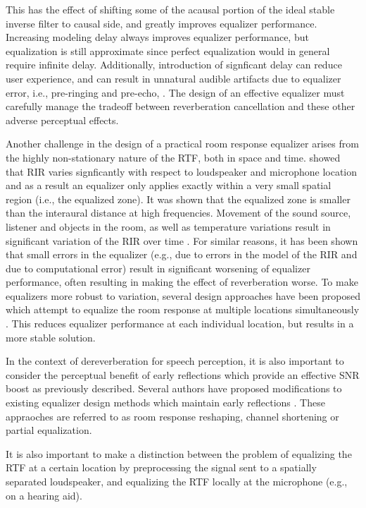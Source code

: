 This has the effect of shifting some of the acausal portion of the ideal stable inverse filter to causal side, and greatly improves equalizer performance. Increasing modeling delay always improves equalizer performance, but equalization is still approximate since perfect equalization would in general require infinite delay. Additionally, introduction of signficant delay can reduce user experience, and can result in unnatural audible artifacts due to equalizer error, i.e., pre-ringing and pre-echo, \citep{brannmark2009spatially}. The design of an effective equalizer must carefully manage the tradeoff between reverberation cancellation and these other adverse perceptual effects.

Another challenge in the design of a practical room response equalizer arises from the highly non-stationary nature of the RTF, both in space and time. \cite{mourjopoulos1985variation} showed that RIR varies signficantly with respect to loudspeaker and microphone location and as a result an equalizer only applies exactly within a very small spatial region (i.e., the equalized zone). It was shown that the equalized zone is smaller than the interaural distance at high frequencies. Movement of the sound source, listener and objects in the room, as well as temperature variations result in significant variation of the RIR over time \citep{omura1999compensating}. For similar reasons, it has been shown that small errors in the equalizer (e.g., due to errors in the model of the RIR and due to computational error) result in significant worsening of equalizer performance, often resulting in making the effect of reverberation worse. To make equalizers more robust to variation, several design approaches have been proposed which attempt to equalize the room response at multiple locations simultaneously \citep{elliott1989multiple, haneda1997multiple}. This reduces equalizer performance at each individual location, but results in a more stable solution.

In the context of dereverberation for speech perception, it is also important to consider the perceptual benefit of early reflections which provide an effective SNR boost as previously described. Several authors have proposed modifications to existing equalizer design methods which maintain early reflections \citep{karjalainen2006equalization, maamar2006partial, mei2009room}. These appraoches are referred to as room response reshaping, channel shortening or partial equalization.

It is also important to make a distinction between the problem of equalizing the RTF at a certain location by preprocessing the signal sent to a spatially separated loudspeaker, and equalizing the RTF locally at the microphone (e.g., on a hearing aid).

